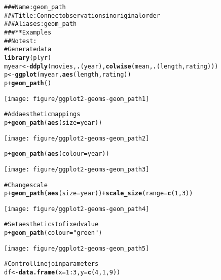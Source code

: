 \documentclass[a4paper,titlepage]{tufte-handout}\usepackage{graphicx, color}
\makeatletter
\def\maxwidth{ %
  \ifdim\Gin@nat@width>\linewidth
    \linewidth
  \else
    \Gin@nat@width
  \fi
}
\newcommand{\hlfunctioncall}[1]{\textcolor[rgb]{0.501960784313725,0,0.329411764705882}{\textbf{#1}}}%
\newcommand{\hlstring}[1]{\textcolor[rgb]{0.6,0.6,1}{#1}}%
\newcommand{\hlcomment}[1]{\textcolor[rgb]{0.180392156862745,0.6,0.341176470588235}{#1}}%
\newenvironment{kframe}{%
 \def\at@end@of@kframe{}%
 \ifinner\ifhmode%
  \def\at@end@of@kframe{\end{minipage}}%
  \begin{minipage}{\columnwidth}%
 \fi\fi%
 \def\FrameCommand##1{\hskip\@totalleftmargin \hskip-\fboxsep
 \colorbox{shadecolor}{##1}\hskip-\fboxsep
     \hskip-\linewidth \hskip-\@totalleftmargin \hskip\columnwidth}%
 \MakeFramed {\advance\hsize-\width
   \@totalleftmargin\z@ \linewidth\hsize
   \@setminipage}}%
 {\par\unskip\endMakeFramed%
 \at@end@of@kframe}
\newenvironment{knitrout}{}{} %
\makeatother
\begin{document}
\begin{knitrout}
\color{fgcolor}\begin{kframe}
\begin{alltt}
\hlcomment{### Name: geom_path}
\hlcomment{### Title: Connect observations in original order}
\hlcomment{### Aliases: geom_path}
\hlcomment{### ** Examples}
\hlcomment{## No test: }
\hlcomment{# Generate data}
\hlfunctioncall{library}(plyr)
myear <- \hlfunctioncall{ddply}(movies, \hlfunctioncall{.}(year), \hlfunctioncall{colwise}(mean, \hlfunctioncall{.}(length, rating)))
p <- \hlfunctioncall{ggplot}(myear, \hlfunctioncall{aes}(length, rating))
p + \hlfunctioncall{geom_path}()
\end{alltt}
\end{kframe}\texttt{[image: figure/ggplot2-geoms-geom\_path1]} \begin{kframe}\begin{alltt}
\hlcomment{# Add aesthetic mappings}
p + \hlfunctioncall{geom_path}(\hlfunctioncall{aes}(size = year))
\end{alltt}
\end{kframe}\texttt{[image: figure/ggplot2-geoms-geom\_path2]} \begin{kframe}\begin{alltt}
p + \hlfunctioncall{geom_path}(\hlfunctioncall{aes}(colour = year))
\end{alltt}
\end{kframe}\texttt{[image: figure/ggplot2-geoms-geom\_path3]} \begin{kframe}\begin{alltt}
\hlcomment{# Change scale}
p + \hlfunctioncall{geom_path}(\hlfunctioncall{aes}(size = year)) + \hlfunctioncall{scale_size}(range = \hlfunctioncall{c}(1, 3))
\end{alltt}
\end{kframe}\texttt{[image: figure/ggplot2-geoms-geom\_path4]} \begin{kframe}\begin{alltt}
\hlcomment{# Set aesthetics to fixed value}
p + \hlfunctioncall{geom_path}(colour = \hlstring{"green"})
\end{alltt}
\end{kframe}\texttt{[image: figure/ggplot2-geoms-geom\_path5]} \begin{kframe}\begin{alltt}
\hlcomment{# Control line join parameters}
df <- \hlfunctioncall{data.frame}(x = 1:3, y = \hlfunctioncall{c}(4, 1, 9))

\end{alltt}
\end{kframe}
\end{knitrout}
\end{document}
